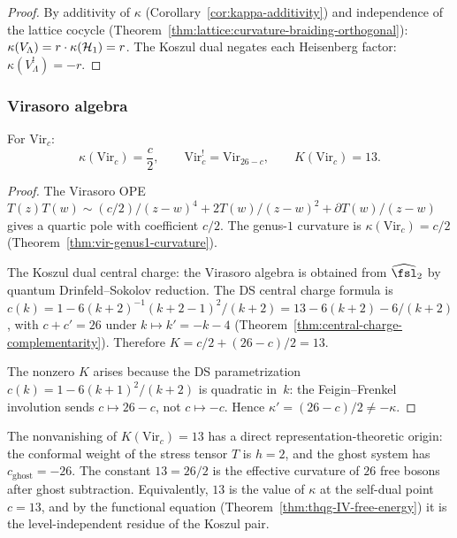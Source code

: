 \begin{proof}
By additivity of $\kappa$ (Corollary~\ref{cor:kappa-additivity}) and
independence of the lattice cocycle
(Theorem~\ref{thm:lattice:curvature-braiding-orthogonal}):
$\kappa(V_\Lambda) = r \cdot \kappa(\mathcal{H}_1) = r$.
The Koszul dual negates each Heisenberg factor: $\kappa(V_\Lambda^!) = -r$.
\end{proof}

\subsubsection{Virasoro algebra}

\begin{theorem}
\label{thm:thqg-IV-virasoro-K}
For $\mathrm{Vir}_c$:
\begin{equation}\label{eq:thqg-IV-virasoro-kappa}
\kappa(\mathrm{Vir}_c) = \frac{c}{2},
\qquad
\mathrm{Vir}_c^! = \mathrm{Vir}_{26-c},
\qquad
K(\mathrm{Vir}_c) = 13.
\end{equation}
\end{theorem}

\begin{proof}
The Virasoro OPE $T(z) T(w) \sim (c/2)/(z-w)^4 + 2T(w)/(z-w)^2
+ \partial T(w)/(z-w)$ gives a quartic pole with coefficient $c/2$.
The genus-$1$ curvature is $\kappa(\mathrm{Vir}_c) = c/2$
(Theorem~\ref{thm:vir-genus1-curvature}).

The Koszul dual central charge: the Virasoro algebra is obtained from
$\widehat{\fsl}_2$ by quantum Drinfeld--Sokolov reduction.
The DS central charge formula is
$c(k) = 1 - 6(k+2)^{-1}(k+2-1)^2/(k+2)
= 13 - 6(k+2) - 6/(k+2)$,
with $c + c' = 26$ under $k \mapsto k' = -k - 4$
(Theorem~\ref{thm:central-charge-complementarity}).
Therefore
$K = c/2 + (26-c)/2 = 13$.

The nonzero $K$ arises because the DS parametrization
$c(k) = 1 - 6(k+1)^2/(k+2)$ is quadratic in~$k$: the Feigin--Frenkel
involution sends $c \mapsto 26 - c$, not $c \mapsto -c$. Hence
$\kappa' = (26-c)/2 \neq -\kappa$.
\end{proof}

\begin{remark}
\label{rem:thqg-IV-virasoro-anomaly}
The nonvanishing of $K(\mathrm{Vir}_c) = 13$ has a direct
representation-theoretic origin: the conformal weight of the stress tensor
$T$ is $h = 2$, and the ghost system has $c_{\mathrm{ghost}} = -26$.
The constant $13 = 26/2$ is the effective curvature of $26$ free bosons
after ghost subtraction. Equivalently, $13$ is the value of $\kappa$
at the self-dual point $c = 13$, and by the functional equation
(Theorem~\ref{thm:thqg-IV-free-energy}) it is the level-independent
residue of the Koszul pair.
\end{remark}

